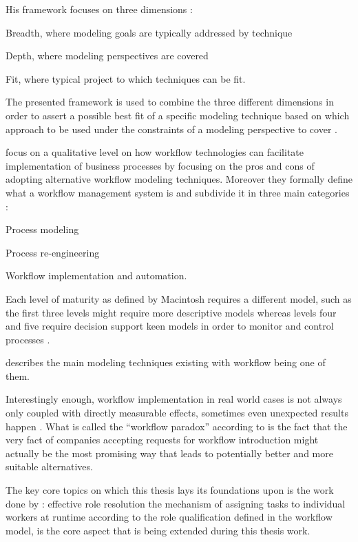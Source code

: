 \documentclass[draft=false]{seal_thesis}
\begin{document}
His framework focuses on three dimensions \citep{Giaglis2001}:
\begin{enumerate*}
	\item Breadth, where modeling goals are typically addressed by technique
	\item Depth, where modeling perspectives are covered
	\item Fit, where typical project to which techniques can be fit.
\end{enumerate*}

The presented framework is used to combine the three different dimensions in order to assert a possible best fit of a specific modeling technique based on which approach to be used under the constraints of a modeling perspective to cover \citep{Giaglis2001}.

\citet{Mentzas2001} focus on a qualitative level on how workflow technologies can facilitate implementation of business processes by focusing on the pros and cons of adopting alternative workflow modeling techniques. Moreover they formally define what a workflow management system is and subdivide it in three main categories \citep{Mentzas2001}:
\begin{enumerate*}
	\item Process modeling
	\item Process re-engineering
	\item Workflow implementation and automation.
\end{enumerate*}

Each level of maturity as defined by Macintosh requires a different model, such as the first three levels might require more descriptive models whereas levels four and five require decision support keen models in order to monitor and control processes \citep{Mentzas2001}.

\citet{Aguilar-Saven2004} describes the main modeling techniques existing with workflow being one of them.

Interestingly enough, workflow implementation in real world cases is not always only coupled with directly measurable effects, sometimes even unexpected results happen \citep{Reijers2005}. What is called the ``workflow paradox'' according to \citet{Reijers2005} is the fact that the very fact of companies accepting requests for workflow introduction might actually be the most promising way that leads to potentially better and more suitable alternatives.

The key core topics on which this thesis lays its foundations upon is the work done by \citet{Zeng2005}: effective role resolution \ie the mechanism of assigning tasks to individual workers at runtime according to the role qualification defined in the workflow model, is the core aspect that is being extended during this thesis work.
\end{document}
